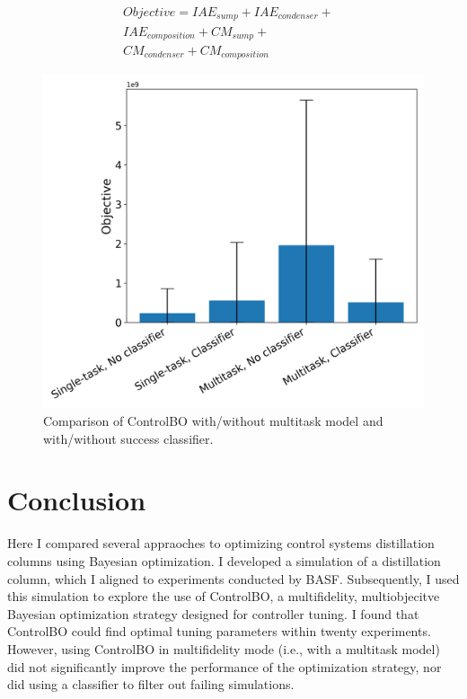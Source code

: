 \begin{equation}
\begin{split}
    Objective = IAE_{sump} + IAE_{condenser} +  & \\ IAE_{composition} +  CM_{sump} + & \\  CM_{condenser} + CM_{composition}
\end{split}
\end{equation}

\begin{figure}
    \centering
    \includegraphics[width=\textwidth]{gfx/Chapter06/comparison.png}
    \caption{Comparison of ControlBO with/without multitask model and with/without success classifier.}
    \label{fig:comparison_controlbo}
\end{figure}

\section{Conclusion}

Here I compared several appraoches to optimizing control systems distillation columns using Bayesian optimization. I developed a simulation of a distillation column, which I aligned to experiments conducted by BASF. Subsequently, I used this simulation to explore the use of ControlBO, a multifidelity, multiobjecitve Bayesian optimization strategy designed for controller tuning. I found that ControlBO could find optimal tuning parameters within twenty experiments. However,  using ControlBO in multifidelity mode (i.e., with a multitask model) did not significantly improve the performance of the optimization strategy, nor did using a classifier to filter out failing simulations.

